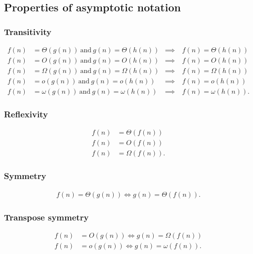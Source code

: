 \documentclass{report}
\begin{document}
        \bigbreak \noindent 
        \subsection{Properties of asymptotic notation}
        \bigbreak \noindent 
        \subsubsection{Transitivity}
        \bigbreak \noindent 
        \begin{align*}
            f(n) &= \Theta(g(n)) \ \text{and} \ g(n) = \Theta(h(n)) &\implies& \ f(n) = \Theta(h(n))  \\
            f(n) &= O(g(n)) \ \text{and} \ g(n) = O(h(n)) &\implies& \ f(n) = O(h(n))  \\
            f(n) &= \Omega(g(n)) \ \text{and} \ g(n) = \Omega(h(n)) &\implies& \ f(n) = \Omega(h(n)) \\
            f(n) &= o(g(n)) \ \text{and} \ g(n) = o(h(n)) &\implies& \ f(n) = o(h(n)) \\
            f(n) &= \omega(g(n)) \ \text{and} \ g(n) = \omega(h(n)) &\implies& \ f(n) = \omega(h(n))
        .\end{align*}

        \bigbreak \noindent 
        \subsubsection{Reflexivity}
        \begin{align*}
            f(n) &= \Theta(f(n)) \\
            f(n) &= O(f(n)) \\
            f(n) &= \Omega(f(n)) 
        .\end{align*}
        \bigbreak \noindent 
        \subsubsection{Symmetry}
        \bigbreak \noindent 
        \begin{align*}
            f(n) = \Theta(g(n)) \iff g(n) = \Theta(f(n))
        .\end{align*}
        \bigbreak \noindent 
        \subsubsection{Transpose symmetry}
        \bigbreak \noindent 
        \begin{align*}
            f(n) &= O(g(n)) \iff g(n) = \Omega(f(n)) \\
            f(n) &= o(g(n)) \iff g(n) = \omega(f(n))
        .\end{align*}
\end{document}
